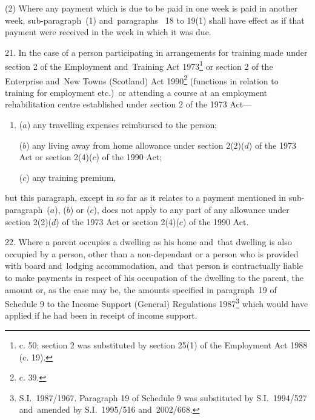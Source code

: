 \documentclass[12pt,a4paper]{article}
\begin{document}
(2) Where any payment which is due to be paid in one week is paid in another week, sub-paragraph~(1) and~paragraphs~
18 to 19(1)  %
shall have effect as if that payment were received in the week in which it was due.


\medskip

21.  In the case of a person participating in arrangements for training made under section 2 of the Employment and~Training Act 1973\footnote{ c. 50; section 2 was substituted by section 25(1) of the Employment Act 1988 (c. 19).} or section 2 of the Enterprise and~New Towns (Scotland) Act 1990\footnote{ c. 39.} (functions in relation to training for employment etc.)\ or attending a course at an employment rehabilitation centre established under section 2 of the 1973 Act—
\begin{enumerate}\item[]
($a$) any travelling expenses reimbursed to the person;

($b$) any living away from home allowance under section 2(2)($d$) of the 1973 Act or section 2(4)($c$) of the 1990 Act;

($c$) any training premium,
\end{enumerate}
but this paragraph, except in so far as it relates to a payment mentioned in sub-paragraph~($a$), ($b$) or ($c$), does not apply to any part of any allowance under section 2(2)($d$) of the 1973 Act or section 2(4)($c$) of the 1990 Act.

\medskip

22.  Where a parent occupies a dwelling as his home and~that dwelling is also occupied by a person, other than a non-dependant or a person who is provided with board and~lodging accommodation, and~that person is contractually liable to make payments in respect of his occupation of the dwelling to the parent, the amount or, as the case may be, the amounts specified in 
paragraph~19 of Schedule 9 to the Income Support (General) Regulations 1987\footnote{S.I.\ 1987/1967. Paragraph 19 of Schedule 9 was substituted by S.I.\ 1994/527 and~amended by S.I.\ 1995/516 and~2002/668.} which would have applied if he had been in receipt of income support.  %
\end{document}
